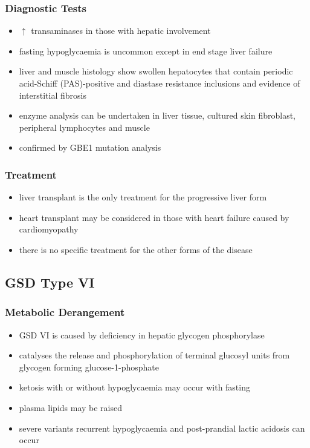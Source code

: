 \documentclass{scrartcl}
\begin{document}
\subsubsection{Diagnostic Tests}
\label{sec:org73deea8}

\begin{itemize}
\item \(\uparrow\) transaminases in those with hepatic involvement
\item fasting hypoglycaemia is uncommon except in end stage liver failure
\item liver and muscle histology show swollen hepatocytes that contain
periodic acid-Schiff (PAS)-positive and diastase resistance
inclusions and evidence of interstitial fibrosis
\item enzyme analysis can be undertaken in liver tissue, cultured skin
fibroblast, peripheral lymphocytes and muscle
\item confirmed by GBE1 mutation analysis
\end{itemize}

\subsubsection{Treatment}
\label{sec:org729f843}
\begin{itemize}
\item liver transplant is the only treatment for the progressive liver form
\item heart transplant may be considered in those with heart failure caused by cardiomyopathy
\item there is no specific treatment for the other forms of the disease
\end{itemize}
\subsection{GSD Type VI}
\label{sec:orgdd29053}
\subsubsection{Metabolic Derangement}
\label{sec:orgf5d346c}
\begin{itemize}
\item GSD VI is caused by deficiency in hepatic glycogen phosphorylase
\item catalyses the release and phosphorylation of terminal glucosyl units
from glycogen forming glucose-1-phosphate
\item ketosis with or without hypoglycaemia may occur with fasting
\item plasma lipids may be raised
\item severe variants recurrent hypoglycaemia and post-prandial lactic
acidosis can occur
\end{itemize}
\end{document}
